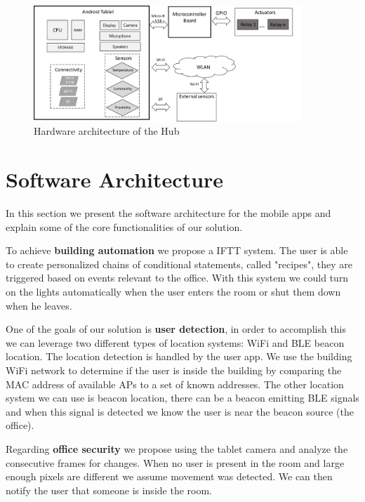 \begin{figure}[h]
\centering
\includegraphics[width=0.9\textwidth]{Figures/hardware}
\caption{Hardware architecture of the Hub}
\label{architecture_system}
\end{figure}


\section{Software Architecture}\label{architecture4} 

In this section we present the software architecture for the mobile apps and explain some of the core functionalities of our solution.

To achieve \textbf{building automation} we propose a \ac{IFTT} system. The user is able to create personalized chains of conditional statements, called "recipes", they are triggered based on events relevant to the office. With this system we could turn on the lights automatically when the user enters the room or shut them down when he leaves.

One of the goals of our solution is \textbf{user detection}, in order to accomplish this we can leverage two different types of location systems: \ac{WiFi} and \ac{BLE} beacon location. The location detection is handled by the user app. We use the building \ac{WiFi} network to determine if the user is inside the building by comparing the \ac{MAC address} of available \ac{AP}s to a set of known addresses. The other location system we can use is beacon location, there can be a beacon emitting \ac{BLE} signals and when this signal is detected we know the user is near the beacon source (the office).

Regarding \textbf{office security} we propose using the tablet camera and analyze the consecutive frames for changes. When no user is present in the room and large enough pixels are different we assume movement was detected. We can then notify the user that someone is inside the room.


